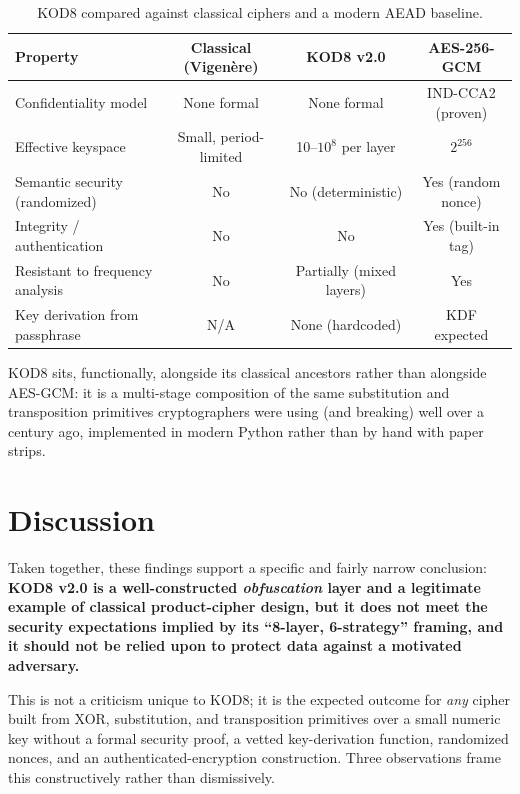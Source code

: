 \documentclass[11pt]{article}
\begin{document}
\begin{table}[h]
\centering
\small
\caption{KOD8 compared against classical ciphers and a modern AEAD baseline.}
\label{tab:comparison}
\begin{tabular}{@{}lccc@{}}
\toprule
\textbf{Property} & \textbf{Classical (Vigen\`ere)} & \textbf{KOD8 v2.0} & \textbf{AES-256-GCM} \\
\midrule
Confidentiality model & None formal & None formal & IND-CCA2 (proven) \\
Effective keyspace & Small, period-limited & 10--$10^{8}$ per layer & $2^{256}$ \\
Semantic security (randomized) & No & No (deterministic) & Yes (random nonce) \\
Integrity / authentication & No & No & Yes (built-in tag) \\
Resistant to frequency analysis & No & Partially (mixed layers) & Yes \\
Key derivation from passphrase & N/A & None (hardcoded) & KDF expected \\
\bottomrule
\end{tabular}
\end{table}

KOD8 sits, functionally, alongside its classical ancestors rather than
alongside AES-GCM: it is a multi-stage composition of the same
substitution and transposition primitives cryptographers were using
(and breaking) well over a century ago, implemented in modern Python
rather than by hand with paper strips.

\section{Discussion}
\label{sec:discussion}

Taken together, these findings support a specific and fairly narrow
conclusion: \textbf{KOD8 v2.0 is a well-constructed \emph{obfuscation}
layer and a legitimate example of classical product-cipher design, but
it does not meet the security expectations implied by its ``8-layer,
6-strategy'' framing, and it should not be relied upon to protect data
against a motivated adversary.}

This is not a criticism unique to KOD8; it is the expected outcome for
\emph{any} cipher built from XOR, substitution, and transposition
primitives over a small numeric key without a formal security proof,
a vetted key-derivation function, randomized nonces, and an
authenticated-encryption construction. Three observations frame this
constructively rather than dismissively.
\end{document}
